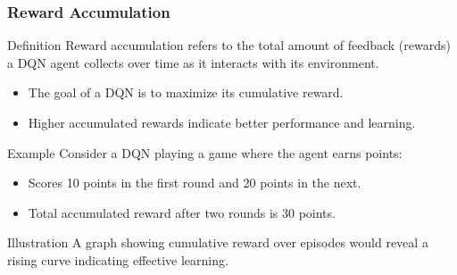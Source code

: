 \documentclass[aspectratio=169]{beamer}
\begin{document}
\begin{frame}[fragile]
    \frametitle{Reward Accumulation}
    \begin{block}{Definition}
        Reward accumulation refers to the total amount of feedback (rewards) a DQN agent collects over time as it interacts with its environment.
    \end{block}
    
    \begin{itemize}
        \item The goal of a DQN is to maximize its cumulative reward.
        \item Higher accumulated rewards indicate better performance and learning.
    \end{itemize}

    \begin{block}{Example}
        Consider a DQN playing a game where the agent earns points:
        \begin{itemize}
            \item Scores 10 points in the first round and 20 points in the next.
            \item Total accumulated reward after two rounds is 30 points.
        \end{itemize}
    \end{block}
    
    \begin{block}{Illustration}
        A graph showing cumulative reward over episodes would reveal a rising curve indicating effective learning.
    \end{block}
\end{frame}
\end{document}
